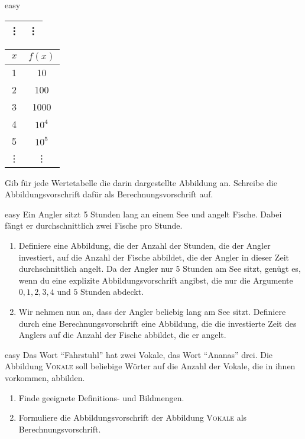 \documentclass[../funktionen.tex]{subfiles}
\begin{document}
\begin{exercise}{easy}
\begin{multicols}{5}
\begin{center}
\begin{tabular}{cc}
            \vdots & \vdots\\\bottomrule
        \end{tabular}
        \begin{tabular}{cc}\toprule
            $x$ & $f(x)$ \\\midrule
            1 & 10\\
            2 & 100\\
            3 & 1000\\
            4 & $10^4$\\
            5 & $10^5$\\
            \vdots & \vdots\\\bottomrule
        \end{tabular}
    \end{center}
\end{multicols}
    Gib für jede Wertetabelle die darin dargestellte Abbildung an. Schreibe die Abbildungsvorschrift dafür als Berechnungsvorschrift auf.
\end{exercise}
\begin{exercise}{easy}
    Ein Angler sitzt 5 Stunden lang an einem See und angelt Fische. Dabei fängt er durchschnittlich zwei Fische pro Stunde.
    \begin{enumerate}
        \item Definiere eine Abbildung, die der Anzahl der Stunden, die der Angler investiert, auf die Anzahl der Fische abbildet, die der Angler in dieser Zeit durchschnittlich angelt. Da der Angler nur 5 Stunden am See sitzt, genügt es, wenn du eine explizite Abbildungsvorschrift angibst, die nur die Argumente $0, 1, 2, 3, 4$ und $5$ Stunden abdeckt.
        \item Wir nehmen nun an, dass der Angler beliebig lang am See sitzt. Definiere durch eine Berechnungsvorschrift eine Abbildung, die die investierte Zeit des Anglers auf die Anzahl der Fische abbildet, die er angelt.
    \end{enumerate}
\end{exercise}
\begin{exercise}{easy}
    Das Wort \enquote{Fahrstuhl} hat zwei Vokale, das Wort \enquote{Ananas} drei. Die Abbildung \textsc{Vokale} soll beliebige Wörter auf die Anzahl der Vokale, die in ihnen vorkommen, abbilden.
    \begin{enumerate}
        \item Finde geeignete Definitions- und Bildmengen.
        \item Formuliere die Abbildungsvorschrift der Abbildung \textsc{Vokale} als Berechnungsvorschrift.
    \end{enumerate}
\end{exercise}
\end{document}
